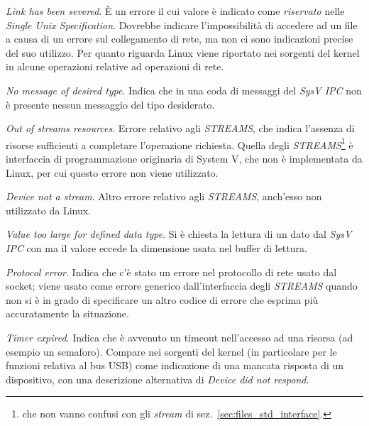 \begin{basedescript}{\desclabelwidth{1.5cm}\desclabelstyle{\nextlinelabel}}
\item[\errcode{ENOLINK} \textit{Link has been severed}.] È un errore il cui
  valore è indicato come \textsl{riservato} nelle \textit{Single Unix
    Specification}. Dovrebbe indicare l'impossibilità di accedere ad un file a
  causa di un errore sul collegamento di rete, ma non ci sono indicazioni
  precise del suo utilizzo. Per quanto riguarda Linux viene riportato nei
  sorgenti del kernel in alcune operazioni relative ad operazioni di rete. 

\item[\errcode{ENOMSG} \textit{No message of desired type}.] Indica che in una
  coda di messaggi del \textit{SysV IPC} non è presente nessun messaggio del
  tipo desiderato.

\item[\errcode{ENOSR} \textit{Out of streams resources}.] Errore relativo agli
  \textit{STREAMS}, che indica l'assenza di risorse sufficienti a completare
  l'operazione richiesta. Quella degli \textit{STREAMS}\footnote{che non vanno
    confusi con gli \textit{stream} di sez.~\ref{sec:files_std_interface}.}  è
  interfaccia di programmazione originaria di System V, che non è implementata
  da Linux, per cui questo errore non viene utilizzato.

\item[\errcode{ENOSTR} \textit{Device not a stream}.] Altro errore relativo
  agli \textit{STREAMS}, anch'esso non utilizzato da Linux.

\item[\errcode{EOVERFLOW} \textit{Value too large for defined data type}.] Si è
  chiesta la lettura di un dato dal \textit{SysV IPC} con  ma
  il valore eccede la dimensione usata nel buffer di lettura.

\item[\errcode{EPROTO} \textit{Protocol error}.] Indica che c'è stato un errore
  nel protocollo di rete usato dal socket; viene usato come errore generico
  dall'interfaccia degli \textit{STREAMS} quando non si è in grado di
  specificare un altro codice di errore che esprima più accuratamente la
  situazione.

\item[\errcode{ETIME} \textit{Timer expired}.] Indica che è avvenuto un timeout
  nell'accesso ad una risorsa (ad esempio un semaforo). Compare nei sorgenti
  del kernel (in particolare per le funzioni relativa al bus USB) come
  indicazione di una mancata risposta di un dispositivo, con una descrizione
  alternativa di \textit{Device did not respond}.
\end{basedescript}



